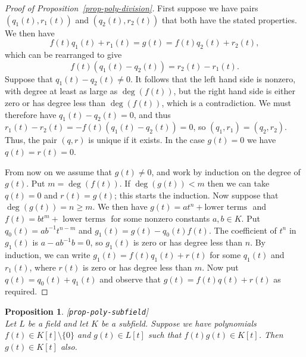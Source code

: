 \documentclass{amsart}
\newcommand{\lbl}[1]{\label{#1}\textup{[\texttt{#1}]}\ \\}
\newcommand{\lbl}{\label}
\newcommand{\sm}        {\setminus}
\renewcommand{\:}{\colon}
\newtheorem{proposition}[theorem]{Proposition}
\theoremstyle{definition}
\begin{document}
\begin{proof}[Proof of Proposition~\ref{prop-poly-division}]
 First suppose we have pairs $(q_1(t),r_1(t))$ and $(q_2(t),r_2(t))$
 that both have the stated properties.  We then have 
 \[ f(t)q_1(t) + r_1(t) = g(t) = f(t)q_2(t) + r_2(t), \]
 which can be rearranged to give
 \[ f(t)(q_1(t)-q_2(t)) = r_2(t)-r_1(t). \]
 Suppose that $q_1(t)-q_2(t)\neq 0$.  It follows that the left hand
 side is nonzero, with degree at least as large as $\deg(f(t))$, but
 the right hand side is either zero or has degree less than
 $\deg(f(t))$, which is a contradiction.  We must therefore have
 $q_1(t)-q_2(t)=0$, and thus $r_1(t)-r_2(t)=-f(t)(q_1(t)-q_2(t))=0$,
 so $(q_1,r_1)=(q_2,r_2)$.  Thus, the pair $(q,r)$ is unique if it
 exists.  In the case $g(t)=0$ we have $q(t)=r(t)=0$. 

 From now on we assume that $g(t)\neq 0$, and work by induction on the
 degree of $g(t)$.  Put $m=\deg(f(t))$.  If $\deg(g(t))<m$ then we can
 take $q(t)=0$ and $r(t)=g(t)$; this starts the induction.  Now
 suppose that $\deg(g(t))=n\geq m$.  We then have $g(t)=at^n+\text{
  lower terms }$ and $f(t)=bt^m+\text{ lower terms }$ for some nonzero
 constants $a,b\in K$.  Put $q_0(t)=ab^{-1}t^{n-m}$ and
 $g_1(t)=g(t)-q_0(t)f(t)$.  The coefficient of $t^n$ in $g_1(t)$ is
 $a-ab^{-1}b=0$, so $g_1(t)$ is zero or has degree less than $n$.  By
 induction, we can write $g_1(t)=f(t)q_1(t)+r(t)$ for some $q_1(t)$
 and $r_1(t)$, where $r(t)$ is zero or has degree less than $m$.
 Now put $q(t)=q_0(t)+q_1(t)$ and observe that $g(t)=f(t)q(t)+r(t)$ as
 required. 
\end{proof}

\begin{proposition}\lbl{prop-poly-subfield}
 Let $L$ be a field and let $K$ be a subfield.  Suppose we have
 polynomials $f(t)\in K[t]\sm\{0\}$ and $g(t)\in L[t]$ such that
 $f(t)g(t)\in K[t]$.  Then $g(t)\in K[t]$ also.
\end{proposition}
\end{document}
